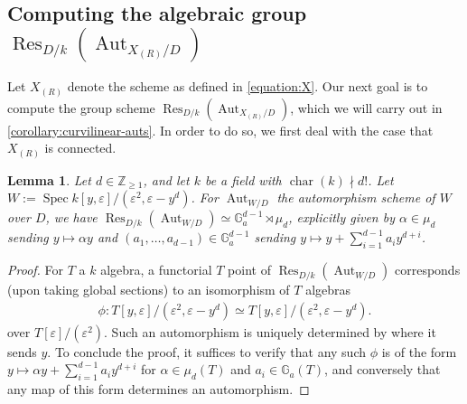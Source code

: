 \documentclass[12 pt]{amsart}
\theoremstyle{plain}
\newtheorem{lemma}[theorem]{Lemma}
\theoremstyle{definition}
\theoremstyle{remark}
\numberwithin{equation}{section}
\newcommand\bg{\mathbb G}
\newcommand\bz{\mathbb Z}
\DeclareMathOperator\spec{\operatorname{Spec}}
\DeclareMathOperator\res{Res}
\DeclareMathOperator\chr{\operatorname{char}}
\DeclareMathOperator\aut{Aut}
\begin{document}
\subsection{Computing the algebraic group $\res_{D/k}(\aut_{X_{(R)}/D})$}
\label{subsection:computing-h}

Let $X_{(R)}$ denote the scheme as defined in \autoref{equation:X}.  Our next goal is
to compute the group scheme $\res_{D/k}(\aut_{X_{(R)}/D})$,
which we will carry out in \autoref{corollary:curvilinear-auts}.
In order to do so, we
first deal with the case that $X_{(R)}$ is connected.


\begin{lemma} \label{lemma:single-component-auts} Let $d \in \bz_{\geq 1}$, and
	let $k$ be a field with $\chr(k) \nmid d!$. 
	Let $W := \spec k[y,\varepsilon]/(\varepsilon^2, \varepsilon-y^d)$.
	For $\aut_{W/D}$ the automorphism scheme of $W$ over $D$, we have
$\res_{D/k}(\aut_{W/D}) \simeq \bg_a^{d-1} \rtimes \mu_d$, explicitly given
	by $\alpha \in \mu_d$ sending $y \mapsto \alpha y$ and $(a_1, \ldots,
a_{d-1}) \in \bg_a^{d-1}$ sending $y \mapsto y + \sum_{i=1}^{d-1}
	a_iy^{d+i}$.  \end{lemma} \begin{proof}
	For $T$ a $k$ algebra, a functorial $T$ point of
	$\res_{D/k}(\aut_{W/D})$ corresponds (upon taking global sections) to
	an isomorphism of $T$ algebras \begin{align*} \phi:
		T[y,\varepsilon]/(\varepsilon^2, \varepsilon-y^d) \simeq T[y,
		\varepsilon]/(\varepsilon^2, \varepsilon-y^d).  \end{align*}
		over $T[\varepsilon]/(\varepsilon^2)$.  Such an automorphism is
		uniquely determined by where it sends $y$.  To conclude the
		proof, it suffices to verify that any such $\phi$ is of the
		form $y \mapsto \alpha y + \sum_{i=1}^{d-1} a_i y^{d+i}$ for
		$\alpha \in \mu_d(T)$ and $a_i \in \bg_a(T)$, and conversely
		that any map of this form determines an automorphism.


\end{proof}
\end{document}
